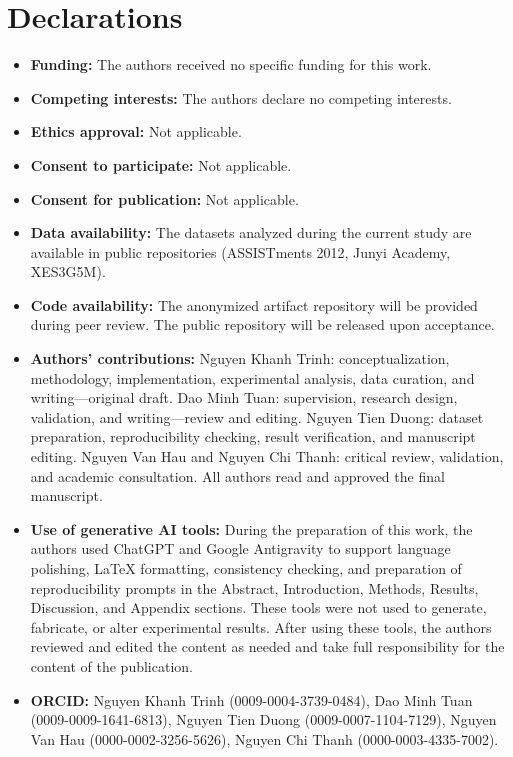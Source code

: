 \documentclass[sn-mathphys]{sn-jnl}
\begin{document}
\backmatter

\section*{Declarations}

\begin{itemize}
    \item \textbf{Funding:} The authors received no specific funding for this work.
    \item \textbf{Competing interests:} The authors declare no competing interests.
    \item \textbf{Ethics approval:} Not applicable.
    \item \textbf{Consent to participate:} Not applicable.
    \item \textbf{Consent for publication:} Not applicable.
    \item \textbf{Data availability:} The datasets analyzed during the current study are available in public repositories (ASSISTments 2012, Junyi Academy, XES3G5M).
    \item \textbf{Code availability:} The anonymized artifact repository will be provided during peer review. The public repository will be released upon acceptance.
    \item \textbf{Authors' contributions:} Nguyen Khanh Trinh: conceptualization, methodology, implementation, experimental analysis, data curation, and writing---original draft. Dao Minh Tuan: supervision, research design, validation, and writing---review and editing. Nguyen Tien Duong: dataset preparation, reproducibility checking, result verification, and manuscript editing. Nguyen Van Hau and Nguyen Chi Thanh: critical review, validation, and academic consultation. All authors read and approved the final manuscript.
    \item \textbf{Use of generative AI tools:} During the preparation of this work, the authors used ChatGPT and Google Antigravity to support language polishing, LaTeX formatting, consistency checking, and preparation of reproducibility prompts in the Abstract, Introduction, Methods, Results, Discussion, and Appendix sections. These tools were not used to generate, fabricate, or alter experimental results. After using these tools, the authors reviewed and edited the content as needed and take full responsibility for the content of the publication.
    \item \textbf{ORCID:} Nguyen Khanh Trinh (0009-0004-3739-0484), Dao Minh Tuan (0009-0009-1641-6813), Nguyen Tien Duong (0009-0007-1104-7129), Nguyen Van Hau (0000-0002-3256-5626), Nguyen Chi Thanh (0000-0003-4335-7002).
\end{itemize}

\clearpage
\begin{appendices}

\end{appendices}



\end{document}
